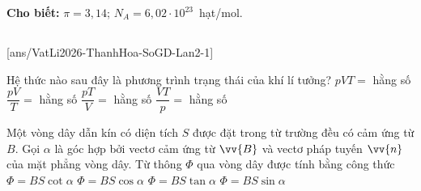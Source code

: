 \def\CheDo{solcolor}%
\def\tenchuong{Sở GD\&ĐT Thanh Hóa -- Lần 2}
\def\thuonghieu{VẬT LÍ 12 -- Eduzy.com.vn}
\def\TachCauDS{1}
\def\TachCauLG{1}


\newcommand{\THproton}[2]{\shade[ball color=VLdo!40] (#1,#2) circle (0.27); \node at (#1,#2) {p};}
\newcommand{\THneutron}[2]{\shade[ball color=gray!75] (#1,#2) circle (0.27); \node[white] at (#1,#2) {n};}


	\noindent\textbf{Cho biết:} $\pi=3{,}14$; $N_A=6{,}02\cdot 10^{23}$~hạt/mol.

	\noindent
	\subsection*{}
	\setcounter{ex}{0}
	[ans/VatLi2026-ThanhHoa-SoGD-Lan2-1]

	\begin{ex}%
		Hệ thức nào sau đây là phương trình trạng thái của khí lí tưởng?
		\choice
		{$pVT=$ hằng số}
		{\True $\dfrac{pV}{T}=$ hằng số}
		{$\dfrac{pT}{V}=$ hằng số}
		{$\dfrac{VT}{p}=$ hằng số}
	\end{ex}

	\begin{ex}%
		Một vòng dây dẫn kín có diện tích $S$ được đặt trong từ trường đều có cảm ứng từ $B$. Gọi $\alpha$ là góc hợp bởi vectơ cảm ứng từ $\vv{B}$ và vectơ pháp tuyến $\vv{n}$ của mặt phẳng vòng dây. Từ thông $\Phi$ qua vòng dây được tính bằng công thức
		\choice
		{$\Phi=BS\cot\alpha$}
		{\True $\Phi=BS\cos\alpha$}
		{$\Phi=BS\tan\alpha$}
		{$\Phi=BS\sin\alpha$}
	\end{ex}

